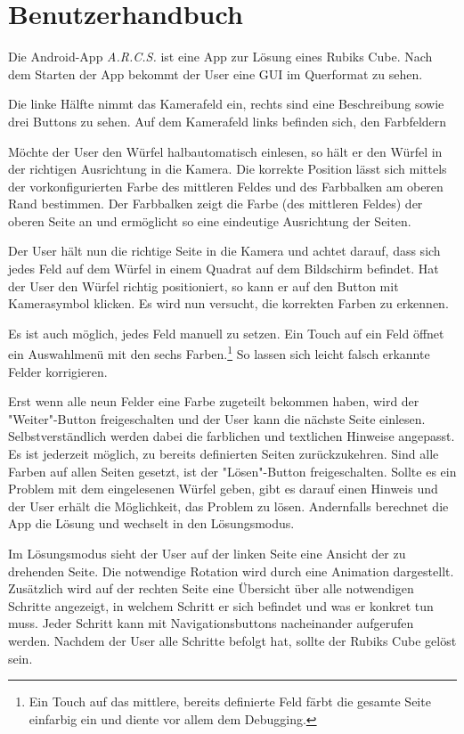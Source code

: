 \section{Benutzerhandbuch}  %

Die Android-App \emph{A.R.C.S.} ist eine App zur Lösung eines Rubiks Cube.
Nach dem Starten der App bekommt der User eine GUI im Querformat zu sehen.

Die linke Hälfte nimmt das Kamerafeld ein, rechts sind eine Beschreibung sowie
drei Buttons zu sehen. Auf dem Kamerafeld links befinden sich, den Farbfeldern

Möchte der User den Würfel halbautomatisch einlesen, so hält er den Würfel in
der richtigen Ausrichtung in die Kamera. Die korrekte Position lässt sich
mittels der vorkonfigurierten Farbe des mittleren Feldes und des Farbbalken am
oberen Rand bestimmen. Der Farbbalken zeigt die Farbe (des mittleren
Feldes) der oberen Seite an und ermöglicht so eine eindeutige Ausrichtung der
Seiten.

Der User hält nun die richtige Seite in die Kamera und achtet darauf, dass sich
jedes Feld auf dem Würfel in einem Quadrat auf dem Bildschirm befindet. Hat der
User den Würfel richtig positioniert, so kann er auf den Button mit Kamerasymbol
klicken. Es wird nun versucht, die korrekten Farben zu erkennen. 

Es ist auch möglich, jedes Feld manuell zu setzen. Ein Touch auf ein Feld öffnet
ein Auswahlmenü mit den sechs Farben.\footnote{Ein Touch auf das mittlere, bereits
definierte Feld färbt die gesamte Seite einfarbig ein und diente vor allem dem
Debugging.} So lassen sich leicht falsch erkannte Felder korrigieren.

Erst wenn alle neun Felder eine Farbe zugeteilt bekommen haben, wird der
"Weiter"-Button freigeschalten und der User kann die nächste Seite einlesen.
Selbstverständlich werden dabei die farblichen und textlichen Hinweise
angepasst. Es ist jederzeit möglich, zu bereits definierten Seiten
zurückzukehren. Sind alle Farben auf allen Seiten gesetzt, ist der
"Lösen"-Button freigeschalten. Sollte es ein Problem mit dem eingelesenen Würfel
geben, gibt es darauf einen Hinweis und der User erhält die Möglichkeit, das
Problem zu lösen. Andernfalls berechnet die App die Lösung und wechselt in den
Lösungsmodus.

Im Lösungsmodus sieht der User auf der linken Seite eine Ansicht der zu
drehenden Seite. Die notwendige Rotation wird durch eine Animation dargestellt.
Zusätzlich wird auf der rechten Seite eine Übersicht über alle notwendigen
Schritte angezeigt, in welchem Schritt er sich befindet und was er konkret tun
muss. Jeder Schritt kann mit Navigationsbuttons nacheinander aufgerufen werden.
Nachdem der User alle Schritte befolgt hat, sollte der Rubiks Cube gelöst sein.

